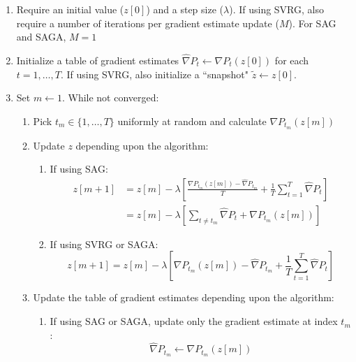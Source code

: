 \iffalse

\begin{enumerate}
    \item Require an initial value ($z[0]$) and a step size ($\lambda$). If using SVRG, also require a number of iterations per gradient estimate update ($M$). For SAG and SAGA, $M = 1$
    \item Initialize a table of gradient estimates $\widehat \nabla P_t \leftarrow \nabla P_t (z[0])$ for each $t = 1,\ldots,T$. If using SVRG, also initialize a ``snapshot" $\tilde z \leftarrow z[0]$.
    \item Set $m \gets 1$. While not converged:
    \begin{enumerate}
        \item Pick $t_m \in \{1,\ldots,T\}$ uniformly at random and calculate $\nabla P_{t_m}(z[m])$
        \item Update $z$ depending upon the algorithm:
        \begin{enumerate}
            \item If using SAG:
            \begin{align}
                z[m+1] &= z[m] - \lambda \left[\frac{\nabla P_{t_m}(z[m]) - \widehat \nabla P_{t_m}}{T} + \frac{1}{T} \sum_{t=1}^T \widehat \nabla P_{t} \right] \label{eqn:SAG_update} \\
                &= z[m] - \lambda \left[ \sum_{t \neq t_m} \widehat \nabla P_{t} + \nabla P_{t_m}(z[m]) \right] \nonumber
            \end{align}
            \item If using SVRG or SAGA:
            \begin{equation}
                z[m+1] = z[m] - \lambda \left[\nabla P_{t_m}(z[m]) - \widehat \nabla P_{t_m} + \frac{1}{T} \sum_{t=1}^T \widehat \nabla P_{t} \right]
                \label{eqn:SAGA_update}
            \end{equation}
        \end{enumerate}
        \item Update the table of gradient estimates depending upon the algorithm:
        \begin{enumerate}
            \item If using SAG or SAGA, update only the gradient estimate at index $t_m$:
            \begin{equation}
                \widehat \nabla P_{t_m} \leftarrow \nabla P_{t_m}(z[m])
            \end{equation}

\end{enumerate}
\end{enumerate}
\end{enumerate}

